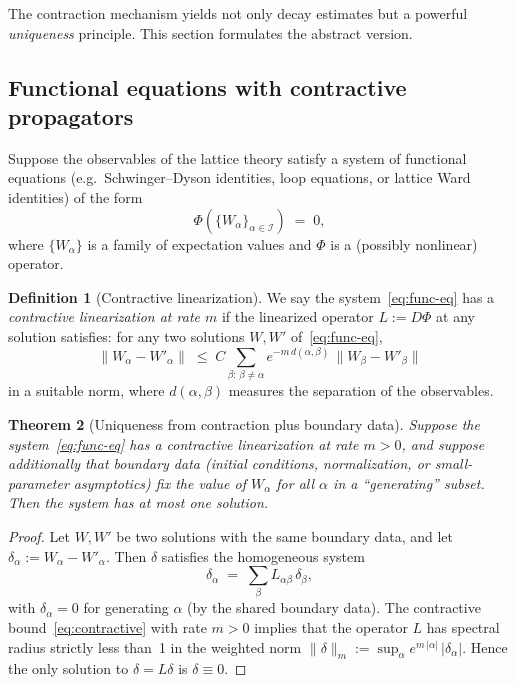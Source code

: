 \documentclass[11pt]{article}
\newtheorem{theorem}{Theorem}[section]
\theoremstyle{definition}
\newtheorem{definition}[theorem]{Definition}
\newcommand{\1}{\mathbf{1}}
\newcommand{\norm}[1]{\lVert #1\rVert}
\begin{document}
The contraction mechanism yields not only decay estimates but a powerful \emph{uniqueness}
principle.  This section formulates the abstract version.

\subsection{Functional equations with contractive propagators}

Suppose the observables of the lattice theory satisfy a system of functional equations
(e.g.\ Schwinger--Dyson identities, loop equations, or lattice Ward identities) of the form
\begin{equation}\label{eq:func-eq}
\Phi(\{W_\alpha\}_{\alpha\in\mathcal{I}}) \;=\; 0,
\end{equation}
where $\{W_\alpha\}$ is a family of expectation values and $\Phi$ is a (possibly nonlinear)
operator.

\begin{definition}[Contractive linearization]
We say the system~\eqref{eq:func-eq} has a \emph{contractive linearization at rate $m$}
if the linearized operator $L:=D\Phi$ at any solution satisfies: for any two solutions
$W,W'$ of~\eqref{eq:func-eq},
\begin{equation}\label{eq:contractive}
\norm{W_\alpha - W'_\alpha}
\;\le\; C\sum_{\beta:\,\beta\ne\alpha}
e^{-m\,d(\alpha,\beta)}\,\norm{W_\beta - W'_\beta}
\end{equation}
in a suitable norm, where $d(\alpha,\beta)$ measures the separation of the observables.
\end{definition}

\begin{theorem}[Uniqueness from contraction plus boundary data]\label{thm:uniqueness}
Suppose the system~\eqref{eq:func-eq} has a contractive linearization at rate $m>0$,
and suppose additionally that boundary data (initial conditions, normalization, or
small-parameter asymptotics) fix the value of $W_\alpha$ for all $\alpha$ in a
``generating'' subset.  Then the system has at most one solution.
\end{theorem}

\begin{proof}
Let $W,W'$ be two solutions with the same boundary data, and let $\delta_\alpha:=W_\alpha-W'_\alpha$.
Then $\delta$ satisfies the homogeneous system
\[
\delta_\alpha \;=\; \sum_\beta L_{\alpha\beta}\,\delta_\beta,
\]
with $\delta_\alpha=0$ for generating $\alpha$ (by the shared boundary data).  The contractive
bound~\eqref{eq:contractive} with rate $m>0$ implies that the operator $L$ has spectral
radius strictly less than~1 in the weighted norm $\norm{\delta}_m:=\sup_\alpha e^{m\,|\alpha|}\,|\delta_\alpha|$.
Hence the only solution to $\delta = L\delta$ is $\delta\equiv 0$.
\end{proof}
\end{document}
